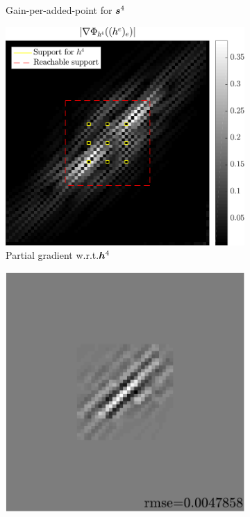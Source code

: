 \begin{figure}[!h]
\begin{subfigure}[b]{0.34\linewidth}
	\caption{Gain-per-added-point for $\bm{s}^4$}\label{fig_gain_n4-gain}
	\end{subfigure}
	\begin{subfigure}[b]{0.34\linewidth}\centering
	\includegraphics[width=\linewidth]{figures/xp/n4/xp_128x128_sc2_angl1_K3_S3_node4_partgrad4.pdf}
	\caption{Partial gradient w.r.t.\@ $\bm{h}^4$}\label{fig_gain_n4-grad}
	\end{subfigure}
	\begin{subfigure}[b]{0.30\linewidth}\centering
	\includegraphics[width=\linewidth]{figures/xp/n4/xp_128x128_sc2_angl1_K3_S3_node4_approx.pdf}

\end{subfigure}
\end{figure}
